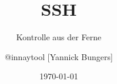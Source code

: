 \documentclass[handout]{beamer}
\title{SSH}
\subtitle{Kontrolle aus der Ferne}
\author{@innaytool [Yannick Bungers]}
\institute{FOSS AG}
\date{\today}
\begin{document}
\begin{frame}
\titlepage
\end{frame}

%



%










\end{document}
